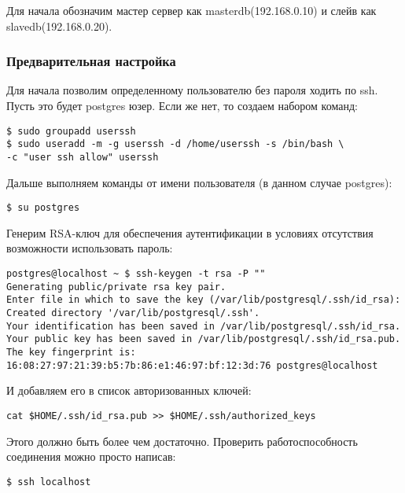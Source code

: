 Для начала обозначим мастер сервер как masterdb(192.168.0.10) и слейв как slavedb(192.168.0.20).

\subsubsection{Предварительная настройка}

Для начала позволим определенному пользователю без пароля ходить по ssh. Пусть это будет postgres юзер. Если же нет, то создаем набором команд:

\begin{lstlisting}[label=lst:streaming1,caption=Создаем пользователя userssh]
$ sudo groupadd userssh
$ sudo useradd -m -g userssh -d /home/userssh -s /bin/bash \
-c "user ssh allow" userssh
\end{lstlisting}

Дальше выполняем команды от имени пользователя (в данном случае postgres):

\begin{lstlisting}[label=lst:streaming2,caption=Логинимся под пользователем postgres]
$ su postgres
\end{lstlisting}

Генерим RSA-ключ для обеспечения аутентификации в условиях отсутствия возможности использовать пароль:
\begin{lstlisting}[label=lst:streaming3,caption=Генерим RSA-ключ]
postgres@localhost ~ $ ssh-keygen -t rsa -P ""
Generating public/private rsa key pair.
Enter file in which to save the key (/var/lib/postgresql/.ssh/id_rsa):
Created directory '/var/lib/postgresql/.ssh'.
Your identification has been saved in /var/lib/postgresql/.ssh/id_rsa.
Your public key has been saved in /var/lib/postgresql/.ssh/id_rsa.pub.
The key fingerprint is:
16:08:27:97:21:39:b5:7b:86:e1:46:97:bf:12:3d:76 postgres@localhost
\end{lstlisting}

И добавляем его в список авторизованных ключей:
\begin{lstlisting}[label=lst:streaming4,caption=Добавляем его в список авторизованных ключей]
cat $HOME/.ssh/id_rsa.pub >> $HOME/.ssh/authorized_keys
\end{lstlisting}

Этого должно быть более чем достаточно. Проверить работоспособность соединения можно просто написав:
\begin{lstlisting}[label=lst:streaming5,caption=Пробуем зайти на ssh без пароля]
$ ssh localhost
\end{lstlisting}

